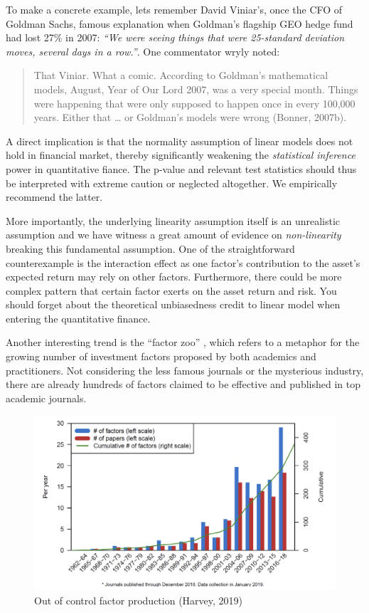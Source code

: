 \documentclass[
]{book}
\begin{document}
To make a concrete example, lets remember David Viniar's, once the CFO of Goldman Sachs, famous explanation when Goldman's flagship GEO hedge fund had lost 27\% in 2007: {\emph{``We were seeing things that were 25-standard deviation moves, several days in a row.''}}. One commentator wryly noted:

\begin{quote}
That Viniar. What a comic. According to Goldman's mathematical models, August, Year of Our Lord 2007, was a very special month. Things were happening that were only supposed to happen once in every 100,000 years. Either that \ldots{} or Goldman's models were wrong (Bonner, 2007b).
\end{quote}

A direct implication is that the normality assumption of linear models does not hold in financial market, thereby significantly weakening the {\emph{statistical inference}} power in quantitative fiance. The p-value and relevant test statistics should thus be interpreted with extreme caution or neglected altogether. We empirically recommend the latter.

More importantly, the underlying linearity assumption itself is an unrealistic assumption and we have witness a great amount of evidence on {\emph{non-linearity}} breaking this fundamental assumption. One of the straightforward counterexample is the interaction effect as one factor's contribution to the asset's expected return may rely on other factors. Furthermore, there could be more complex pattern that certain factor exerts on the asset return and risk. You should forget about the theoretical unbiasedness credit to linear model when entering the quantitative finance.

Another interesting trend is the ``factor zoo'' \citep{harvey2019census}, which refers to a metaphor for the growing number of investment factors proposed by both academics and practitioners. Not considering the less famous journals or the mysterious industry, there are already hundreds of factors claimed to be effective and published in top academic journals.\\

\begin{figure}
\includegraphics[width=0.9\linewidth]{images/chapter3/factor_zoo} \caption{Out of control factor production (Harvey, 2019)}\label{fig:unnamed-chunk-2}
\end{figure}
\end{document}
